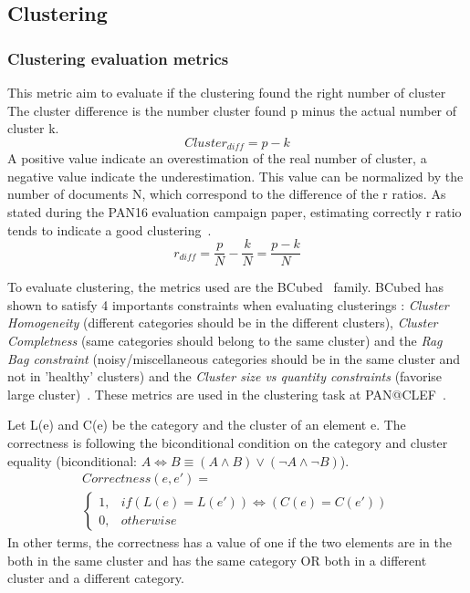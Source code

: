 \subsection{Clustering}

\subsubsection{Clustering evaluation metrics}

\begin{definition}
  This metric aim to evaluate if the clustering found the right number of cluster
  The cluster difference is the number cluster found p minus the actual number of cluster k.
  \begin{equation}
    Cluster_{diff} = p - k
  \end{equation}
  A positive value indicate an overestimation of the real number of cluster, a negative value indicate the underestimation.
  This value can be normalized by the number of documents N, which correspond to the difference of the r ratios.
  As stated during the PAN16 evaluation campaign paper, estimating correctly r ratio tends to indicate a good clustering~\cite{pan16}.
  \begin{equation}
    r_{diff} = \frac{p}{N} - \frac{k}{N} = \frac{p - k}{N}
  \end{equation}
\end{definition}

To evaluate clustering, the metrics used are the BCubed~\cite{bcubed} family.
BCubed has shown to satisfy 4 importants constraints when evaluating clusterings : \textit{Cluster Homogeneity} (different categories should be in the different clusters), \textit{Cluster Completness} (same categories should belong to the same cluster) and the \textit{Rag Bag constraint} (noisy/miscellaneous categories should be in the same cluster and not in 'healthy' clusters) and the \textit{Cluster size vs quantity constraints} (favorise large cluster)~\cite{bcubed}.
These metrics are used in the clustering task at PAN@CLEF~\cite{pan16}.

\begin{definition}
  Let L(e) and C(e) be the category and the cluster of an element e.
  The correctness is following the biconditional condition on the category and cluster equality (biconditional: $A \Longleftrightarrow B \equiv (A \land B) \lor (\neg A \land \neg B)$).
  \begin{gather*}
    Correctness(e, e') = \\
    \begin{cases}
      1, & if (L(e) = L(e')) \Longleftrightarrow (C(e) = C(e'))\\
      0, & otherwise
    \end{cases}
  \end{gather*}
  In other terms, the correctness has a value of one if the two elements are in the both in the same cluster and has the same category OR both in a different cluster and a different category.
\end{definition}

